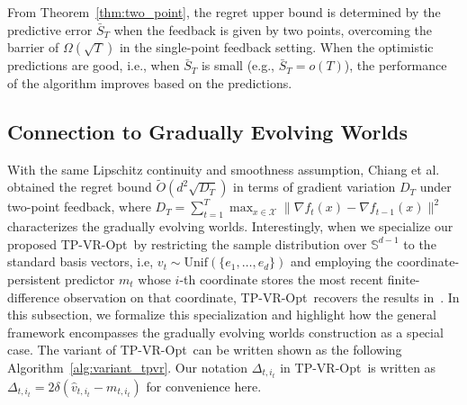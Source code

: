 \documentclass[journal,onecolumn]{IEEEtran}
\newcommand{\cX}{\mathcal{X}}
\theoremstyle{plain}
\theoremstyle{definition}
\theoremstyle{remark}
\newcommand{\tpvr}{{\sc TP-VR-Opt}}
\begin{document}
From Theorem~\ref{thm:two_point}, the regret upper bound is determined by the
predictive error $\bar S_{T}$ when the feedback is given by two points, overcoming
the barrier of $\Omega(\sqrt{T})$ in the single-point feedback setting. When the
optimistic predictions are good, i.e., when $\bar S_{T}$ is small (e.g., $\bar{S}_T=o(T)$), the performance of the algorithm improves based on the predictions.

\subsection{Connection to Gradually Evolving Worlds~\cite{chiang2013beating}}\label{sec:comp_chiang}

With the same Lipschitz continuity and smoothness assumption, Chiang et al.~\cite{chiang2013beating} obtained the regret bound $\widetilde{O}(d^2\sqrt{D_T})$ in terms of gradient variation $D_T$ under   two-point feedback, where $D_T=\sum_{t=1}^T \max_{x\in\cX}\|\nabla f_t(x)-\nabla f_{t-1}(x)\|^2$ characterizes the gradually evolving worlds. Interestingly, when we specialize our proposed \tpvr\, by restricting the sample distribution over $\mathbb{S}^{d-1}$ to the standard basis vectors, i.e, $v_t\sim \mathrm{Unif}(\{e_1,\dotsc,e_d\})$ and employing the coordinate-persistent predictor $m_t$ whose $i$-th coordinate stores the most
recent finite-difference observation on that coordinate, \tpvr\  recovers the results in~\cite{chiang2013beating}. In this subsection, we formalize this specialization and highlight how the general framework encompasses the gradually evolving worlds construction as a special case. The variant of \tpvr\, can be written shown as the following Algorithm~\ref{alg:variant_tpvr}. Our notation $\Delta_{t,i_t}$ in \tpvr\, is written as $\Delta_{t,i_t}=2\delta(\widehat{v}_{t,i_t}-m_{t,i_t})$ for convenience here.
\end{document}
